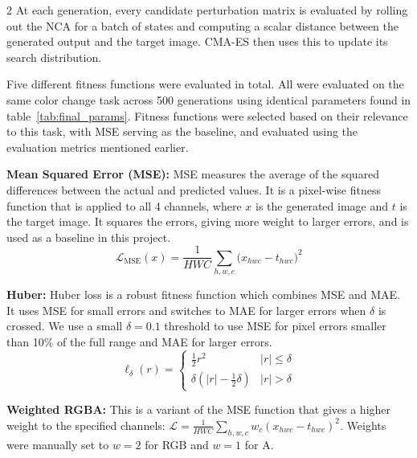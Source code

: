 \documentclass{article}
\begin{document}
\begin{multicols}{2}
At each generation, every candidate perturbation matrix is evaluated by rolling out the NCA for a batch of states and computing a scalar distance between the generated output and the target image. CMA-ES then uses this to update its search distribution.

Five different fitness functions were evaluated in total. All were evaluated on the same color change task across 500 generations using identical parameters found in table~\ref{tab:final_params}.
Fitness functions were selected based on their relevance to this task, with MSE serving as the baseline, and evaluated using the evaluation metrics mentioned earlier.



\textbf{Mean Squared Error (MSE): } 
MSE measures the average of the squared differences between the actual and predicted values.
It is a pixel-wise fitness function that is applied to all 4 channels, where $x$ is the generated image and $t$ is the target image. 
It squares the errors, giving more weight to larger errors, and is used as a baseline in this project.
\begin{equation*}
  \mathcal{L}_{\mathrm{MSE}}(x) = \frac{1}{HWC}
  \sum_{h,w,c}\bigl(x_{hwc} - t_{hwc}\bigr)^2
\end{equation*}


\textbf{Huber: } 
Huber loss \cite{huber1964robust} is a robust fitness function which combines MSE and MAE. 
It uses MSE for small errors and switches to MAE for larger errors when $\delta$ is crossed.
We use a small $\delta = 0.1$ threshold to use MSE for pixel errors smaller than 10\% of the full range and MAE for larger errors.
\begin{equation*}
  \ell_\delta(r) = \begin{cases}
    \tfrac{1}{2}r^2 & |r| \leq \delta \\
    \delta\!\left(|r| - \tfrac{1}{2}\delta\right) & |r| > \delta
  \end{cases}
\end{equation*}


\textbf{Weighted RGBA: }
This is a variant of the MSE function that gives a higher weight to the
specified channels: $\mathcal{L} = \frac{1}{HWC}\sum_{h,w,c} w_c
(x_{hwc} - t_{hwc})^2$. Weights were manually set to $w = 2$ for RGB and $w = 1$ for A.



\end{multicols}
\end{document}
